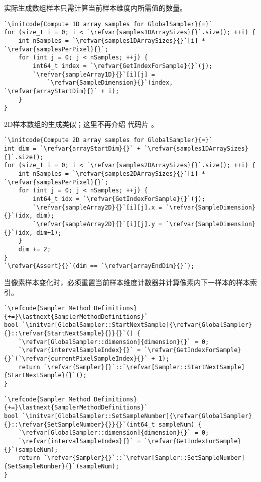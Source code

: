 实际生成数组样本只需计算当前样本维度内所需值的数量。
\begin{lstlisting}
`\initcode{Compute 1D array samples for GlobalSampler}{=}`
for (size_t i = 0; i < `\refvar{samples1DArraySizes}{}`.size(); ++i) {
    int nSamples = `\refvar{samples1DArraySizes}{}`[i] * `\refvar{samplesPerPixel}{}`;
    for (int j = 0; j < nSamples; ++j) {
        int64_t index = `\refvar{GetIndexForSample}{}`(j);
        `\refvar{sampleArray1D}{}`[i][j] =
            `\refvar{SampleDimension}{}`(index, `\refvar{arrayStartDim}{}` + i);
    }
}
\end{lstlisting}

2D样本数组的生成类似；这里不再介绍
代码片
。
\begin{lstlisting}
`\initcode{Compute 2D array samples for GlobalSampler}{=}`
int dim = `\refvar{arrayStartDim}{}` + `\refvar{samples1DArraySizes}{}`.size();
for (size_t i = 0; i < `\refvar{samples2DArraySizes}{}`.size(); ++i) {
    int nSamples = `\refvar{samples2DArraySizes}{}`[i] * `\refvar{samplesPerPixel}{}`;
    for (int j = 0; j < nSamples; ++j) {
        int64_t idx = `\refvar{GetIndexForSample}{}`(j);
        `\refvar{sampleArray2D}{}`[i][j].x = `\refvar{SampleDimension}{}`(idx, dim);
        `\refvar{sampleArray2D}{}`[i][j].y = `\refvar{SampleDimension}{}`(idx, dim+1);
    }
    dim += 2;
}
`\refvar{Assert}{}`(dim == `\refvar{arrayEndDim}{}`);
\end{lstlisting}

当像素样本变化时，必须重置当前样本维度计数器并计算像素内下一样本的样本索引。
\begin{lstlisting}
`\refcode{Sampler Method Definitions}{+=}\lastnext{SamplerMethodDefinitions}`
bool `\initvar[GlobalSampler::StartNextSample]{\refvar{GlobalSampler}{}::\refvar{StartNextSample}{}}{}`() {
    `\refvar[GlobalSampler::dimension]{dimension}{}` = 0;
    `\refvar{intervalSampleIndex}{}` = `\refvar{GetIndexForSample}{}`(`\refvar{currentPixelSampleIndex}{}` + 1);
    return `\refvar{Sampler}{}`::`\refvar[Sampler::StartNextSample]{StartNextSample}{}`();
}
\end{lstlisting}
\begin{lstlisting}
`\refcode{Sampler Method Definitions}{+=}\lastnext{SamplerMethodDefinitions}`
bool `\initvar[GlobalSampler::SetSampleNumber]{\refvar{GlobalSampler}{}::\refvar{SetSampleNumber}{}}{}`(int64_t sampleNum) {
    `\refvar[GlobalSampler::dimension]{dimension}{}` = 0;
    `\refvar{intervalSampleIndex}{}` = `\refvar{GetIndexForSample}{}`(sampleNum);
    return `\refvar{Sampler}{}`::`\refvar[Sampler::SetSampleNumber]{SetSampleNumber}{}`(sampleNum);
}
\end{lstlisting}


